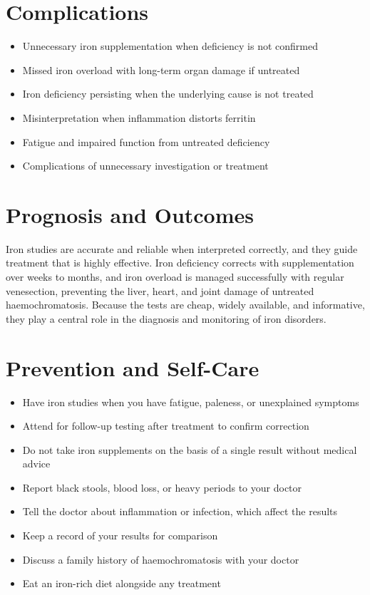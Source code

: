 \section*{Complications}
\begin{itemize}
    \item Unnecessary iron supplementation when deficiency is not confirmed
    \item Missed iron overload with long-term organ damage if untreated
    \item Iron deficiency persisting when the underlying cause is not treated
    \item Misinterpretation when inflammation distorts ferritin
    \item Fatigue and impaired function from untreated deficiency
    \item Complications of unnecessary investigation or treatment
\end{itemize}

\section*{Prognosis and Outcomes}
Iron studies are accurate and reliable when interpreted correctly, and they guide treatment that is highly effective. Iron deficiency corrects with supplementation over weeks to months, and iron overload is managed successfully with regular venesection, preventing the liver, heart, and joint damage of untreated haemochromatosis. Because the tests are cheap, widely available, and informative, they play a central role in the diagnosis and monitoring of iron disorders.

\section*{Prevention and Self-Care}
\begin{itemize}
    \item Have iron studies when you have fatigue, paleness, or unexplained symptoms
    \item Attend for follow-up testing after treatment to confirm correction
    \item Do not take iron supplements on the basis of a single result without medical advice
    \item Report black stools, blood loss, or heavy periods to your doctor
    \item Tell the doctor about inflammation or infection, which affect the results
    \item Keep a record of your results for comparison
    \item Discuss a family history of haemochromatosis with your doctor
    \item Eat an iron-rich diet alongside any treatment
\end{itemize}

